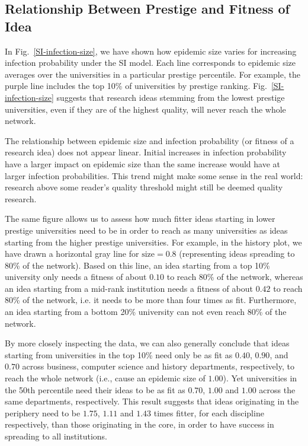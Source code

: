 \documentclass[%
 reprint,
 amsmath,amssymb,
 aps,
]{revtex4-1}
\begin{document}
\subsection{\label{sec:infection}Relationship Between Prestige and Fitness of Idea}

In Fig.~\ref{SI-infection-size}, we have shown how epidemic size varies for increasing infection probability under the SI model. Each line corresponds to epidemic size averages over the universities in a particular prestige percentile. For example, the purple line includes the top 10\% of universities by prestige ranking. Fig.~\ref{SI-infection-size} suggests that research ideas stemming from the lowest prestige universities, even if they are of the highest quality, will never reach the whole network.

The relationship between epidemic size and infection probability (or fitness of a research idea) does not appear linear. Initial increases in infection probability have a larger impact on epidemic size than the same increase would have at larger infection probabilities. This trend might make some sense in the real world: research above some reader's quality threshold might still be deemed quality research.

The same figure allows us to assess how much fitter ideas starting in lower prestige universities need to be in order to reach as many universities as ideas starting from the higher prestige universities. For example, in the history plot, we have drawn a horizontal gray line for $\text{size} = 0.8$ (representing ideas spreading to $80$\% of the network). Based on this line, an idea starting from a top 10\% university only needs a fitness of about $0.10$ to reach $80$\% of the network, whereas an idea starting from a mid-rank institution needs a fitness of about $0.42$ to reach $80$\% of the network, i.e. it needs to be more than four times as fit. Furthermore, an idea starting from a bottom 20\% university can not even reach $80$\% of the network.  

By more closely inspecting the data, we can also generally conclude that ideas starting from universities in the top 10\% need only be as fit as $0.40$, $0.90$, and $0.70$ across business, computer science and history departments, respectively, to reach the whole network (i.e., cause an epidemic size of $1.00$). Yet universities in the 50th percentile need their ideas to be as fit as $0.70$, $1.00$ and $1.00$ across the same departments, respectively. This result suggests that ideas originating in the periphery need to be $1.75$, $1.11$ and $1.43$ times fitter, for each discipline respectively, than those originating in the core, in order to have success in spreading to all institutions.
\end{document}
